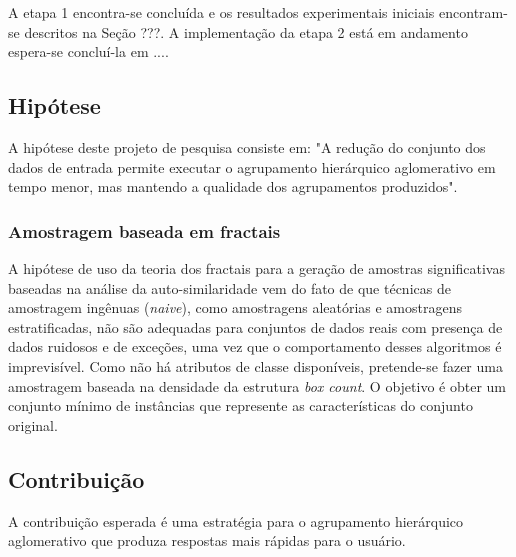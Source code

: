 A etapa 1 encontra-se concluída e os resultados experimentais iniciais encontram-se descritos na Seção ???. A implementação da etapa 2 está em andamento espera-se concluí-la em .... 
	
\subsection{Hipótese}

A hipótese deste projeto de pesquisa consiste em: "A redução do conjunto dos dados de entrada permite executar o agrupamento hierárquico aglomerativo em tempo menor, mas mantendo a qualidade dos agrupamentos produzidos".

\subsubsection{Amostragem baseada em fractais}

A hipótese de uso da teoria dos fractais para a geração de amostras significativas baseadas na análise da auto-similaridade vem do fato de que técnicas de amostragem ingênuas (\textit{naive}), como amostragens aleatórias e amostragens estratificadas, não são adequadas para conjuntos de dados reais com presença de dados ruidosos e de exceções, uma vez que o comportamento desses algoritmos é imprevisível.
Como não há atributos de classe disponíveis, pretende-se fazer uma amostragem baseada na densidade da estrutura \textit{box count}. O objetivo é obter um conjunto mínimo de instâncias que represente as características do conjunto original.



\subsection{Contribuição}

A contribuição esperada é uma estratégia para o agrupamento hierárquico
aglomerativo que produza respostas mais rápidas para o usuário.

